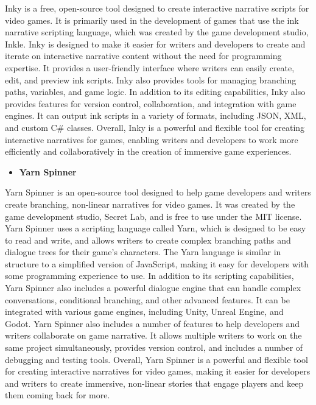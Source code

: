 Inky is a free, open-source tool designed to create interactive narrative scripts for video games. It is primarily used in the development of games that use the ink narrative scripting language, which was created by the game development studio, Inkle.
Inky is designed to make it easier for writers and developers to create and iterate on interactive narrative content without the need for programming expertise. It provides a user-friendly interface where writers can easily create, edit, and preview ink scripts. Inky also provides tools for managing branching paths, variables, and game logic.
In addition to its editing capabilities, Inky also provides features for version control, collaboration, and integration with game engines. It can output ink scripts in a variety of formats, including JSON, XML, and custom C# classes.
Overall, Inky is a powerful and flexible tool for creating interactive narratives for games, enabling writers and developers to work more efficiently and collaboratively in the creation of immersive game experiences.
\begin{itemize}
                \item \textbf{Yarn Spinner}
 \end{itemize}
 
 Yarn Spinner is an open-source tool designed to help game developers and writers create branching, non-linear narratives for video games. It was created by the game development studio, Secret Lab, and is free to use under the MIT license.
Yarn Spinner uses a scripting language called Yarn, which is designed to be easy to read and write, and allows writers to create complex branching paths and dialogue trees for their game's characters. The Yarn language is similar in structure to a simplified version of JavaScript, making it easy for developers with some programming experience to use.
In addition to its scripting capabilities, Yarn Spinner also includes a powerful dialogue engine that can handle complex conversations, conditional branching, and other advanced features. It can be integrated with various game engines, including Unity, Unreal Engine, and Godot.
Yarn Spinner also includes a number of features to help developers and writers collaborate on game narrative. It allows multiple writers to work on the same project simultaneously, provides version control, and includes a number of debugging and testing tools.
Overall, Yarn Spinner is a powerful and flexible tool for creating interactive narratives for video games, making it easier for developers and writers to create immersive, non-linear stories that engage players and keep them coming back for more.

